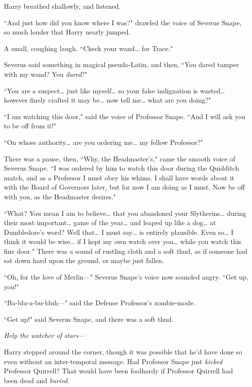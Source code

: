 Harry breathed shallowly, and listened.

``And just how did you know where I was?" drawled the voice of Severus Snape, so much louder that Harry nearly jumped.

A small, coughing laugh. ``Check your wand{\ldots} for Trace."

Severus said something in magical pseudo-Latin, and then, ``You dared tamper with my wand? You \emph{dared}?"

``You are a suspect{\ldots} just like myself{\ldots} so your false indignation is wasted{\ldots} however finely crafted it may be{\ldots} now tell me{\ldots} what are you doing?"

``I am watching this door," said the voice of Professor Snape. ``And I will ask you to be off from it!"

``On whose authority{\ldots} are you ordering me{\ldots} my fellow Professor?"

There was a pause, then, ``Why, the Headmaster's," came the smooth voice of Severus Snape. ``I was ordered by him to watch this door during the Quidditch match, and as a Professor I must obey his whims. I shall have words about it with the Board of Governors later, but for now I am doing as I must. Now be off with you, as the Headmaster desires."

``What? You mean I am to believe{\ldots} that you abandoned your Slytherins{\ldots} during their most important{\ldots} game of the year{\ldots} and leaped up like a dog{\ldots} at Dumbledore's word? Well that{\ldots} I must say{\ldots} is entirely plausible. Even so{\ldots} I think it would be wise{\ldots} if I kept my own watch over you{\ldots} while you watch this fine door." There was a sound of rustling cloth and a soft thud, as if someone had sat down hard upon the ground, or maybe just fallen.

``Oh, for the love of Merlin—" Severus Snape's voice now sounded angry. ``Get up, you!"

``Ba-blu-a-bu-bluh—" said the Defense Professor's zombie-mode.

``Get up!" said Severus Snape, and there was a soft thud.

\emph{Help the watcher of stars—}

Harry stepped around the corner, though it was possible that he'd have done so even without an inter-temporal message. Had Professor Snape just \emph{kicked} Professor Quirrell? That would have been foolhardy if Professor Quirrell had been dead and \emph{buried}.

